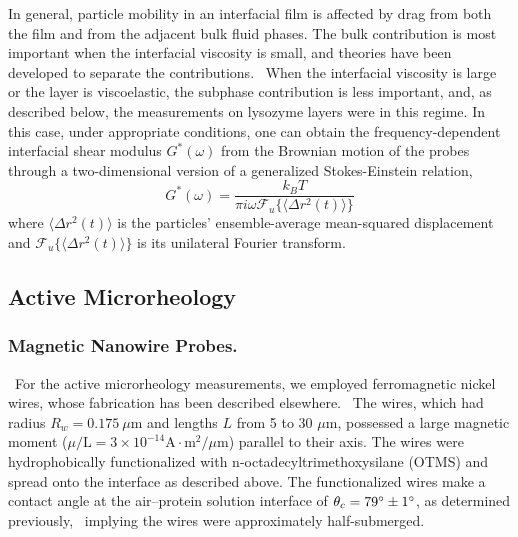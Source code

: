 In general, particle mobility in an interfacial film is affected by drag from both the film and from the adjacent bulk fluid phases.  The bulk contribution is most important when the interfacial viscosity is small, and theories have been developed to separate the contributions.~\cite{Sickert2007, Levine2004, Dhar2006, Fischer2004a, Fischer2006, Levine2004a}  When the interfacial viscosity is large or the layer is viscoelastic, the subphase contribution is less important, and, as described below, the measurements on lysozyme layers were in this regime.  In this case, under appropriate conditions, one can obtain the frequency-dependent interfacial shear modulus $G^*(\omega)$ from the Brownian motion of the probes through a two-dimensional version of a generalized Stokes-Einstein relation,  \cite{Helfer2001, Maestro2011}
\begin{equation}
 G^*(\omega)=\frac{k_B T}{\pi i\omega \mathcal{F}_u \{\langle \Delta r^2 (t) \rangle \} }  \label{eq:StokesEinstein}
\end{equation}
where $\langle \Delta r^2 (t) \rangle$ is the particles' ensemble-average mean-squared displacement and $\mathcal{F}_u \{\langle \Delta r^2 (t) \rangle \}$ is its unilateral Fourier transform.  


\subsection{Active Microrheology}

\subsubsection{Magnetic Nanowire Probes.}~For the active microrheology measurements, we employed ferromagnetic nickel wires, whose fabrication has been described elsewhere.~\cite{Tanase2001} The wires, which had radius $R_w=0.175\ \mu$m and lengths $L$ from 5 to 30 $\mu$m, possessed a large magnetic moment ($\mu/\text{L} = 3\times10^{-14}\text{A}\cdot\text{m}^2/\mu\text{m}$) parallel to their axis. 
The wires were hydrophobically functionalized with n-octadecyltrimethoxysilane (OTMS) and spread onto the interface as described above. The functionalized wires make a contact angle at the air--protein solution interface of $\theta_c = 79^\circ \pm 1^\circ$, as determined previously,~\cite{Lee2010} implying the wires were approximately half-submerged.

